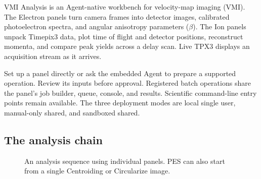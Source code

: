 \documentclass[11pt,a4paper]{article}
\newcommand{\code}[1]{\texttt{#1}}
\newcommand{\file}[1]{\code{\small #1}}
\begin{document}
VMI Analysis is an Agent-native workbench for velocity-map imaging (VMI).
The Electron panels turn camera frames into detector images, calibrated
photoelectron spectra, and angular anisotropy parameters ($\beta$).
The Ion panels unpack Timepix3 data, plot time of flight and detector
positions, reconstruct momenta, and compare peak yields across a delay scan.
Live TPX3 displays an acquisition stream as it arrives.

Set up a panel directly or ask the embedded Agent to prepare a supported
operation. Review its inputs before approval. Registered batch operations
share the panel's job builder, queue, console, and results. Scientific
command-line entry points remain available. The three deployment modes are
local single user, manual-only shared, and sandboxed shared.

\subsection{The analysis chain}
\label{sec:chain}

\begin{figure}[h]
\centering
{}
\caption{An analysis sequence using individual panels. PES can also start
from a single Centroiding or Circularize image.}
\label{fig:chain}
\end{figure}
\end{document}

